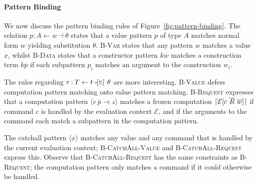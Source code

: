 \documentclass[msc,deptreport,cs]{infthesis} %
\DeclarePairedDelimiter{\ceil}{\lceil}{\rceil}
\newcommand{\many}{\overline}
\newcommand{\bindbase}[4]{{#3} \mathbin{:} {#2} \mathbin{#1} {#4}}
\newcommand{\sigs}{\Sigma}
\newcommand{\effin}[1]{\langle {#1} \rangle}
\newcommand{\EC}{\mathcal{E}}
\newcommand{\venv}{\theta}
\newcommand{\freeze}{\ceil}
\newcommand{\sigyields}[1]
           {\mathbin{\text{-\!-\!}[{\text{\scriptsize ${#1}$}}]\,}}
\newcommand{\bindsv}[4]{\bindbase{\dashv}{#2 \leftarrow #3}{#1}{#4}}
\newcommand{\bindsc}[5]{\bindbase{\sigyields{#4}}{#2 \leftarrow #3}{#1}{#5}}
\begin{document}
\paragraph*{Pattern Binding}

We now discuss the pattern binding rules of Figure~\ref{fig:pattern-binding}.
The relation $\bindsv{p}{A}{w}{\venv}$ states that a value pattern $p$ of type
$A$ matches normal form $w$ yielding substitution $\venv$. \textsc{B-Var} states
that any pattern $w$ matches a value $x$, whilst \textsc{B-Data} states that a
constructor pattern $k \many{w}$ matches a construction term $k \many{p}$ if
each subpattern $p_{i}$ matches an argument to the construction $w_{i}$.


The rules regarding $\bindsc{r}{T}{t}{\sigs}{\venv}$ are more interesting.
\textsc{B-Value} defers computation pattern matching onto value pattern
matching. \textsc{B-Request} expresses that a computation pattern
$\effin{c~\many{p} \to z}$ matches a frozen computation
$\freeze{\EC[c~\many{R}~\many{w}]}$ if command $c$ is handled by the evaluation
context $\EC$, and if the arguments to the command each match a subpattern in
the computation pattern.

The catchall pattern $\effin{x}$ matches any value and any command that is
handled by the current evaluation context; \textsc{B-CatchAll-Value} and
\textsc{B-CatchAll-Request} express this. Observe that
\textsc{B-CatchAll-Request} has the same constraints as \textsc{B-Request}; the
computation pattern only matches a command if it could otherwise be handled.
\end{document}
